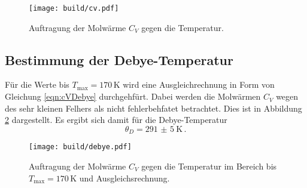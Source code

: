\begin{figure}
  \centering
  \texttt{[image: build/cv.pdf]}
  \caption{Auftragung der Molwärme $C_V$ gegen die Temperatur.}
  \label{fig:cv}
\end{figure}

\subsection{Bestimmung der Debye-Temperatur}
\label{subsec:debye}

Für die Werte bis $T_{\text{max}}=170$\,K wird eine Ausgleichrechnung in Form von Gleichung \eqref{eqn:cVDebye}
durchgehfürt. Dabei werden die Molwärmen $C_V$ wegen des sehr kleinen Felhers als
nicht fehlerbehfatet betrachtet. Dies ist in Abbildung \ref{fig:debye} dargestellt. Es ergibt sich
damit für die Debye-Temperatur
\begin{equation*}
  \theta_D=\SI{291(5)}{\kelvin} \,.
\end{equation*}

\begin{figure}
  \centering
  \texttt{[image: build/debye.pdf]}
  \caption{Auftragung der Molwärme $C_V$ gegen die Temperatur im Bereich bis
  $T_{\text{max}}=170$\,K und Ausgleichsrechnung.}
  \label{fig:debye}
\end{figure}
